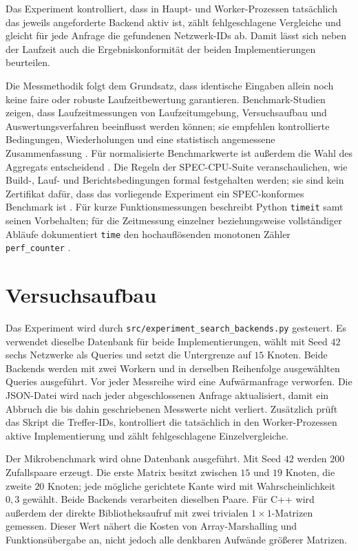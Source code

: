 \documentclass[a4paper,12pt, twoside]{report}
\theoremstyle{definition}
\begin{document}
Das Experiment kontrolliert, dass in Haupt- und Worker-Prozessen tatsächlich das jeweils angeforderte Backend aktiv ist, zählt fehlgeschlagene Vergleiche und gleicht für jede Anfrage die gefundenen Netzwerk-IDs ab. Damit lässt sich neben der Laufzeit auch die Ergebniskonformität der beiden Implementierungen beurteilen.

Die Messmethodik folgt dem Grundsatz, dass identische Eingaben allein noch keine faire oder robuste Laufzeitbewertung garantieren. Benchmark-Studien zeigen, dass Laufzeitmessungen von Laufzeitumgebung, Versuchsaufbau und Auswertungsverfahren beeinflusst werden können; sie empfehlen kontrollierte Bedingungen, Wiederholungen und eine statistisch angemessene Zusammenfassung \cite{georges2007rigorous,kalibera2013benchmarking,mytkowicz2009wrongdata,jain1991performance,lilja2000measuring}. Für normalisierte Benchmarkwerte ist außerdem die Wahl des Aggregats entscheidend \cite{fleming1986benchmarkmeans}. Die Regeln der SPEC-CPU-Suite veranschaulichen, wie Build-, Lauf- und Berichtsbedingungen formal festgehalten werden; sie sind kein Zertifikat dafür, dass das vorliegende Experiment ein SPEC-konformes Benchmark ist \cite{spec2017runrules}. Für kurze Funktionsmessungen beschreibt Python \texttt{timeit} samt seinen Vorbehalten; für die Zeitmessung einzelner beziehungsweise vollständiger Abläufe dokumentiert \texttt{time} den hochauflösenden monotonen Zähler \texttt{perf\_counter} \cite{python314timeit,python314time}.

\section{Versuchsaufbau}
\label{sec:backend_versuchsaufbau}

Das Experiment wird durch \texttt{src/experiment\_search\_backends.py} gesteuert. Es verwendet dieselbe Datenbank für beide Implementierungen, wählt mit Seed $42$ sechs Netzwerke als Queries und setzt die Untergrenze auf $15$ Knoten. Beide Backends werden mit zwei Workern und in derselben Reihenfolge ausgewählten Queries ausgeführt. Vor jeder Messreihe wird eine Aufwärmanfrage verworfen. Die JSON-Datei wird nach jeder abgeschlossenen Anfrage aktualisiert, damit ein Abbruch die bis dahin geschriebenen Messwerte nicht verliert. Zusätzlich prüft das Skript die Treffer-IDs, kontrolliert die tatsächlich in den Worker-Prozessen aktive Implementierung und zählt fehlgeschlagene Einzelvergleiche.

Der Mikrobenchmark wird ohne Datenbank ausgeführt. Mit Seed $42$ werden $200$ Zufallspaare erzeugt. Die erste Matrix besitzt zwischen $15$ und $19$ Knoten, die zweite $20$ Knoten; jede mögliche gerichtete Kante wird mit Wahrscheinlichkeit $0{,}3$ gewählt. Beide Backends verarbeiten dieselben Paare. Für C++ wird außerdem der direkte Bibliotheksaufruf mit zwei trivialen $1\times1$-Matrizen gemessen. Dieser Wert nähert die Kosten von Array-Marshalling und Funktionsübergabe an, nicht jedoch alle denkbaren Aufwände größerer Matrizen.
\end{document}
